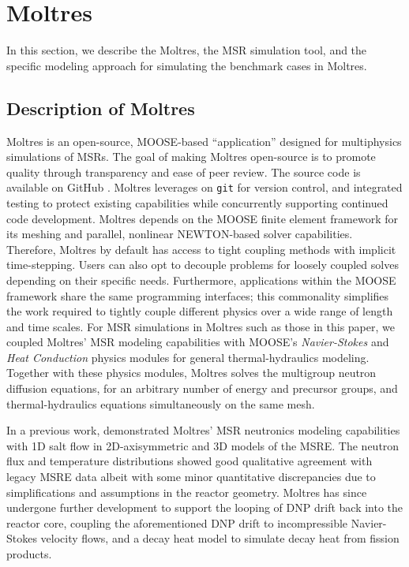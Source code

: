\section{Moltres} \label{sec:moltres}


In this section, we describe the Moltres, the \gls{MSR} simulation tool, and
the specific modeling approach for simulating the benchmark cases in Moltres.

\subsection{Description of Moltres}

Moltres \citep{lindsay_introduction_2018} is an open-source, \gls{MOOSE}-based
``application'' designed for multiphysics simulations of \glspl{MSR}. The goal
of making Moltres open-source is to promote quality through transparency and
ease of peer review. The source code \citep{lindsay_moltres_2017} is available
on GitHub \citep{github_build_2017}. Moltres leverages on \texttt{git} for
version control, and integrated testing to protect existing capabilities while
concurrently supporting continued code development. Moltres depends on the
\gls{MOOSE} finite element framework for its meshing and parallel, nonlinear
NEWTON-based solver capabilities. Therefore,
Moltres by default has access to tight coupling methods with implicit
time-stepping. Users can also opt to decouple problems for loosely coupled
solves depending on their specific needs. Furthermore, applications within the
\gls{MOOSE} framework share the same programming
interfaces; this commonality simplifies the work required to tightly couple
different physics over a wide range of length and time scales. For \gls{MSR}
simulations in Moltres such as those in this paper, we coupled Moltres'
\gls{MSR} modeling capabilities with \gls{MOOSE}'s \textit{Navier-Stokes} and
\textit{Heat Conduction} physics modules \citep{peterson_overview_2017} for
general thermal-hydraulics modeling. Together with these physics modules,
Moltres solves the multigroup neutron diffusion equations, for an arbitrary
number of energy and precursor groups, and thermal-hydraulics equations
simultaneously on the same mesh.

In a previous work, \cite{lindsay_introduction_2018}
demonstrated Moltres' \gls{MSR} neutronics modeling capabilities with 1D salt
flow in 2D-axisymmetric and 3D models of the \gls{MSRE}. The neutron flux and
temperature distributions showed good qualitative agreement with legacy
\gls{MSRE} data albeit with some minor quantitative discrepancies due to
simplifications and assumptions in the reactor geometry. Moltres has
since undergone further development to support the looping of \gls{DNP} drift
back into the reactor core, coupling the aforementioned \gls{DNP} drift
to incompressible Navier-Stokes velocity flows, and a decay heat model to
simulate decay heat from fission products.

